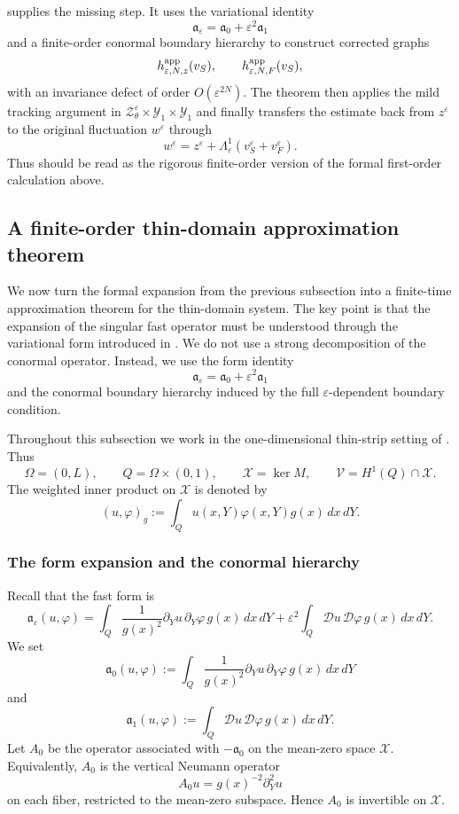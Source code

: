\documentclass[11pt]{article}
\theoremstyle{definition}
\theoremstyle{remark}
\numberwithin{equation}{section}
\begin{document}
 supplies the missing step. It
uses the variational identity
\[
\mathfrak a_\varepsilon
=
\mathfrak a_0+\varepsilon^2\mathfrak a_1
\]
and a finite-order conormal boundary hierarchy to construct corrected graphs
\[
h_{\varepsilon,N,z}^{\rm app}(v_S),
\qquad
h_{\varepsilon,N,F}^{\rm app}(v_S),
\]
with an invariance defect of order \(O(\varepsilon^{2N})\). The theorem then
applies the mild tracking argument in
\(\mathcal Z_\theta^\varepsilon\times\mathcal Y_1\times\mathcal Y_1\) and
finally transfers the estimate back from \(z^\varepsilon\) to the original
fluctuation \(w^\varepsilon\) through
\[
w^\varepsilon
=
z^\varepsilon+\Lambda_\varepsilon^1(v_S^\varepsilon+v_F^\varepsilon).
\]
Thus  should be read as the
rigorous finite-order version of the formal first-order calculation above.


\subsection{A finite-order thin-domain approximation theorem}
\label{subsec:thin-domain-approximation-theorem}

We now turn the formal expansion from the previous subsection into a finite-time
approximation theorem for the thin-domain system. The key point is that the
expansion of the singular fast operator must be understood through the
variational form introduced in . We do not
use a strong decomposition of the conormal operator. Instead, we use the form
identity
\[
\mathfrak a_\varepsilon
=
\mathfrak a_0+\varepsilon^2\mathfrak a_1
\]
and the conormal boundary hierarchy induced by the full
\(\varepsilon\)-dependent boundary condition.

Throughout this subsection we work in the one-dimensional thin-strip setting of
. Thus
\[
\Omega=(0,L),
\qquad
Q=\Omega\times(0,1),
\qquad
\mathcal X=\ker M,
\qquad
\mathcal V=H^1(Q)\cap\mathcal X.
\]
The weighted inner product on \(\mathcal X\) is denoted by
\[
(u,\varphi)_g
:=
\int_Q u(x,Y)\varphi(x,Y)g(x)\,dx\,dY.
\]

\subsubsection*{The form expansion and the conormal hierarchy}

Recall that the fast form is
\[
\mathfrak a_\varepsilon(u,\varphi)
=
\int_Q
\frac1{g(x)^2}
\partial_Yu\,\partial_Y\varphi\,g(x)\,dx\,dY
+
\varepsilon^2
\int_Q
\mathcal Du\,\mathcal D\varphi\,g(x)\,dx\,dY.
\]
We set
\[
\mathfrak a_0(u,\varphi)
:=
\int_Q
\frac1{g(x)^2}
\partial_Yu\,\partial_Y\varphi\,g(x)\,dx\,dY
\]
and
\[
\mathfrak a_1(u,\varphi)
:=
\int_Q
\mathcal Du\,\mathcal D\varphi\,g(x)\,dx\,dY.
\]
Let \(A_0\) be the operator associated with \(-\mathfrak a_0\) on the
mean-zero space \(\mathcal X\). Equivalently, \(A_0\) is the vertical Neumann
operator
\[
A_0u=g(x)^{-2}\partial_Y^2u
\]
on each fiber, restricted to the mean-zero subspace. Hence \(A_0\) is
invertible on \(\mathcal X\).
\end{document}
